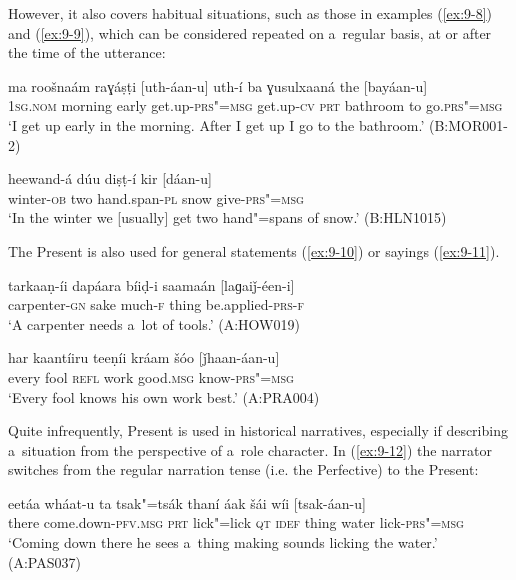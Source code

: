 However, it also covers habitual situations, such as those in examples (\ref{ex:9-8}) and (\ref{ex:9-9}), which can be considered repeated on a~regular basis, at or after the time of the utterance: 

\begin{exe}
\ex
\label{ex:9-8}
\gll ma roošnaám raɣáṣṭi [uth-áan-u] uth-í ba ɣusulxaaná the [bayáan-u] \\
\textsc{1sg.nom} morning early get.up-\textsc{prs"=msg} get.up-\textsc{cv}  \textsc{prt} bathroom to go.\textsc{prs"=msg} \\
\glt `I get up early in the morning. After I get up I go to the bathroom.' (B:MOR001-2)

\ex
\label{ex:9-9}
\gll heewand-á dúu diṣṭ-í kir [dáan-u] \\
winter-\textsc{ob} two hand.span-\textsc{pl} snow give-\textsc{prs"=msg} \\
\glt `In the winter we [usually] get two hand"=spans of snow.' (B:HLN1015)
\end{exe}

The Present is also used for general statements (\ref{ex:9-10}) or sayings (\ref{ex:9-11}).

\begin{exe}
\ex
\label{ex:9-10}
\gll tarkaaṇ-íi dapáara bíiḍ-i saamaán [laɡaiǰ-éen-i]  \\
carpenter-\textsc{gn} sake much-\textsc{f} thing be.applied-\textsc{prs-f} \\
\glt `A carpenter needs a~lot of tools.' (A:HOW019)

\ex
\label{ex:9-11}
\gll har kaantíiru teeṇíi kráam šóo [ǰhaan-áan-u] \\
every fool \textsc{refl} work good.\textsc{msg} know-\textsc{prs"=msg} \\
\glt `Every fool knows his own work best.' (A:PRA004)
\end{exe}

Quite infrequently, Present is used in historical narratives, especially if describing a~situation from the perspective of a~role character. In (\ref{ex:9-12}) the narrator switches from the regular narration tense (i.e. the Perfective) to the Present:

\begin{exe}
\ex
\label{ex:9-12}
\gll eetáa wháat-u ta tsak"=tsák thaní áak šái wíi [tsak-áan-u] \\
there come.down-\textsc{pfv.msg} \textsc{prt} lick"=lick \textsc{qt} \textsc{idef}  thing water lick-\textsc{prs"=msg} \\
\glt `Coming down there he sees a~thing making sounds licking the water.' (A:PAS037)
\end{exe}


